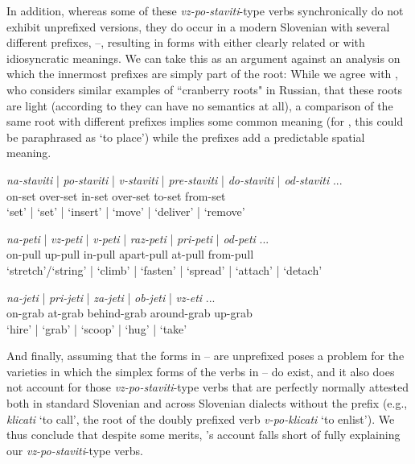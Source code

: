 \documentclass[output=paper,colorlinks,citecolor=brown]{langscibook}
\begin{document}
 In addition, whereas some of these \textit{vz-po-staviti}-type verbs synchronically do not exhibit unprefixed versions, they do occur in a modern Slovenian with several different prefixes, --, resulting in forms with either clearly related or with idiosyncratic meanings. We can take this as an argument against an analysis on which the innermost prefixes are simply part of the root: While we agree with \citet{Romanova2004}, who considers similar examples of ``cranberry roots" in Russian, that these roots are light (according to \citeauthor{Romanova2004} they can have no semantics at all), a comparison of the same root with different prefixes implies some common meaning (for , this could be paraphrased as `to place') while the prefixes add a predictable spatial meaning. 

\ea \label{ex:manystav}\glll  \textit{na-staviti} | \textit{po-staviti} | \textit{v-staviti} | \textit{pre-staviti} | \textit{do-staviti} | \textit{od-staviti} ...\\
{on}-set {} {over}-set {}  {in}-set {} over-set {} to-set {} from-set\\
`set' | `set' |   `insert' | `move' | `deliver' | {`remove'}\\
\z

\ea \label{ex:manypeti} \glll \textit{na-peti} | \textit{vz-peti} | \textit{v-peti} | \textit{raz-peti} | \textit{pri-peti} | \textit{od-peti} ...\\
{on}-pull  {} {up}-pull  {}  {in}-pull  {} {apart}-pull {} {at}-pull {} from-pull \\
`stretch'/`string'  | `climb'  |  `fasten' | `spread' | `attach' |  `detach'\\
\z

\ea \label{ex:manyjeti}\glll \textit{na-jeti} | \textit{pri-jeti} |  \textit{za-jeti} |  \textit{ob-jeti}  |    \textit{vz-eti} ... \\
{on}-grab {} {at}-grab  {} {behind}-grab {}  {around}-grab {}    {up}-grab\\
`hire' | `grab' | `scoop' | `hug' | `take' \\
\z

 \noindent And finally, assuming that the forms in -- are unprefixed poses a problem for the varieties in which the simplex forms of the verbs in -- do exist, and it also does not account for those \textit{vz-po-staviti}-type verbs that are perfectly normally attested both in standard Slovenian and across Slovenian dialects without the prefix (e.g.,  \textit{klicati} `to call', the root of the doubly prefixed verb \textit{v-po-klicati} `to enlist'). We thus conclude that despite some merits, \citeauthor{markova2011nature}'s account falls short of fully explaining our \textit{vz-po-staviti}-type verbs. 
 
\end{document}
